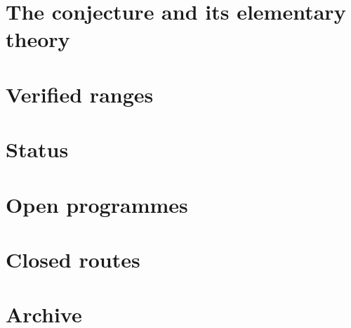 
\part{The conjecture and its elementary theory}



\part{Verified ranges}


\part{Status}


\part{Open programmes}


\part{Closed routes}


\appendix
\part{Archive}


